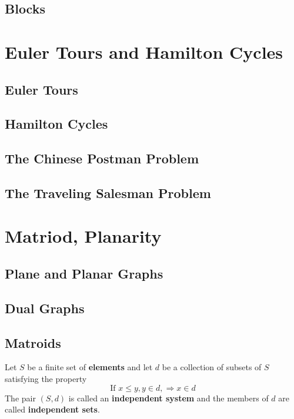 			\section{Blocks}

		\chapter{Euler Tours and Hamilton Cycles}
			\section{Euler Tours}

			\section{Hamilton Cycles}

			\section{The Chinese Postman Problem}

			\section{The Traveling Salesman Problem}

		\chapter{Matriod, Planarity}
			\section{Plane and Planar Graphs}

			\section{Dual Graphs}

			\section{Matroids}
				\begin{definition}[Matroids]
					Let $S$ be a finite set of \textbf{elements} and let $d$ be a collection of subsets of $S$ satisfying the property
					\begin{equation}
						\text{If } x \le y, y\in d, \Rightarrow x \in d
					\end{equation}
					The pair $(S, d)$ is called an \textbf{independent system} and the members of $d$ are called \textbf{independent sets}.
				\end{definition}

